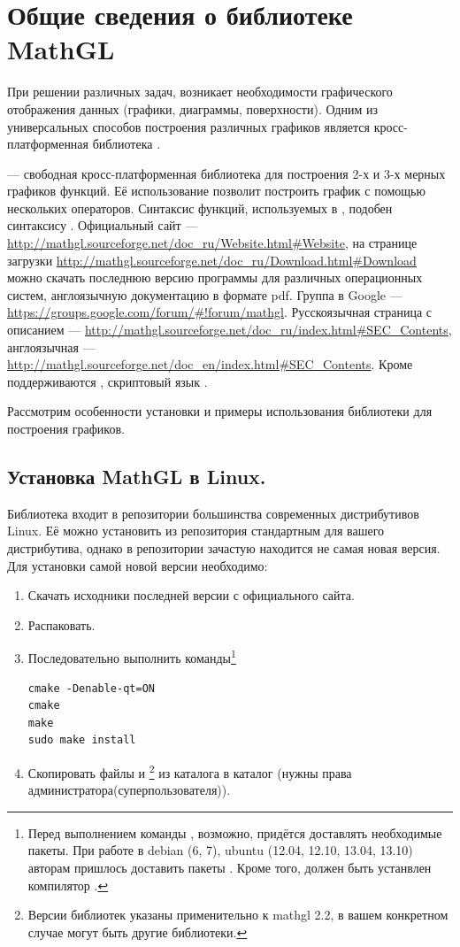 \chapter[Общие сведения о библиотеке MathGL]{Общие сведения о библиотеке MathGL}
При решении различных задач, возникает необходимости графического отображения данных (графики, диаграммы, поверхности).
Одним из универсальных способов построения различных графиков является кросс-платформенная библиотека .

 --- свободная кросс-платформенная библиотека для построения 2-х и 3-х
мерных графиков функций. Её использование позволит построить график с помощью нескольких операторов. Синтаксис функций,
используемых в , подобен синтаксису . Официальный сайт --- 
\url{http://mathgl.sourceforge.net/doc_ru/Website.html#Website}, на странице загрузки
\url{http://mathgl.sourceforge.net/doc_ru/Download.html#Download} можно скачать последнюю версию программы для различных
операционных систем, англоязычную документацию в формате pdf. Группа в Google --- \url{https://groups.google.com/forum/#!forum/mathgl}.
Русскоязычная страница с описанием --- \url{http://mathgl.sourceforge.net/doc_ru/index.html#SEC_Contents}, англоязычная ---
\url{http://mathgl.sourceforge.net/doc_en/index.html#SEC_Contents}. Кроме  поддерживаются , скриптовый язык .

Рассмотрим особенности установки и примеры использования библиотеки для построения графиков.

\section{Установка MathGL в Linux.}
Библиотека входит в репозитории большинства современных дистрибутивов Linux. Её можно установить из репозитория
стандартным для вашего дистрибутива, однако в репозитории зачастую находится не самая новая версия. Для установки самой
новой версии необходимо:

\begin{enumerate}
\item Скачать исходники последней версии с официального сайта.
\item Распаковать.
\item Последовательно выполнить команды\footnote{Перед выполнением команды , возможно, придётся доставлять
необходимые пакеты. При работе в debian (6, 7), ubuntu (12.04, 12.10, 13.04, 13.10) авторам пришлось доставить  пакеты
. Кроме того, должен быть устанвлен компилятор .}
\begin{verbatim}
cmake -Denable-qt=ON
cmake
make
sudo make install
\end{verbatim}
\item Скопировать файлы  и \footnote{Версии библиотек  
указаны применительно к mathgl 2.2, в вашем конкретном случае могут быть другие библиотеки.} 
из каталога  в каталог  (нужны права администратора(суперпользователя)).
\end{enumerate}

